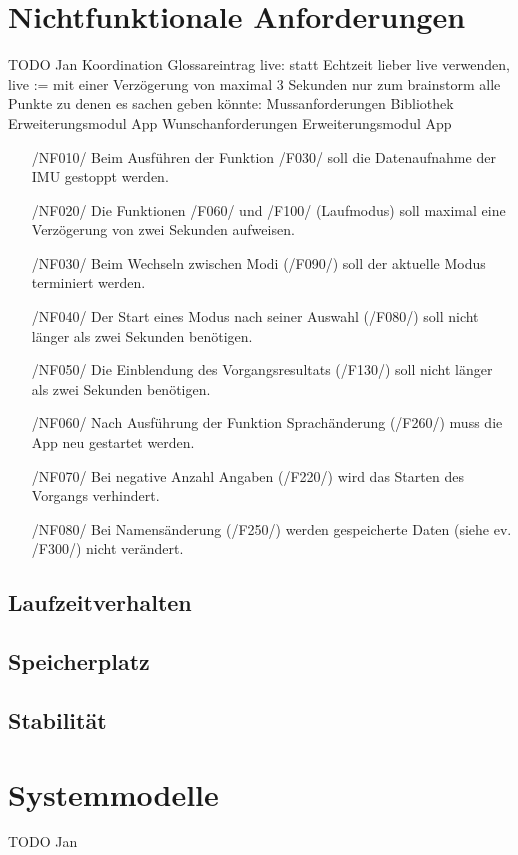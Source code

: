 \documentclass[a4paper,12pt]{article}
\begin{document}
\section{Nichtfunktionale Anforderungen}
TODO Jan Koordination
Glossareintrag \glqq live\grqq{}: statt Echtzeit lieber \glqq live\grqq{} verwenden, live := mit einer Verzögerung von maximal 3 Sekunden
  nur zum brainstorm alle Punkte zu denen es sachen geben könnte:
  {Mussanforderungen}
      {Bibliothek}
      {Erweiterungsmodul}
      {App}
    {Wunschanforderungen}
      {Erweiterungsmodul}
      {App}
\begin{itemize}
  \item[/NF010/] Beim Ausführen der Funktion /F030/ soll die Datenaufnahme der IMU gestoppt werden.
  \item[/NF020/] Die Funktionen /F060/ und /F100/ (Laufmodus) soll maximal eine Verzögerung von zwei Sekunden aufweisen. %
  \item[/NF030/] Beim Wechseln zwischen Modi (/F090/) soll der aktuelle Modus terminiert werden.
  \item[/NF040/] Der Start eines Modus nach seiner Auswahl (/F080/) soll nicht länger als zwei Sekunden benötigen.
  \item[/NF050/] Die Einblendung des Vorgangsresultats (/F130/) soll nicht länger als zwei Sekunden benötigen.
  \item[/NF060/] Nach Ausführung der Funktion  Sprachänderung (/F260/) muss die App neu gestartet werden.
  \item[/NF070/] Bei negative Anzahl Angaben (/F220/) wird das Starten des Vorgangs verhindert.
  \item[/NF080/] Bei Namensänderung (/F250/) werden gespeicherte Daten (siehe ev. /F300/) nicht verändert.
\end{itemize}
\subsection{Laufzeitverhalten}
\subsection{Speicherplatz}
\subsection{Stabilität}

\section{Systemmodelle}
TODO Jan
\end{document}
